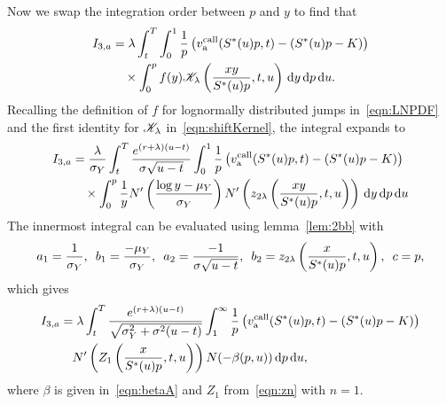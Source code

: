 	Now we swap the integration order between $p$ and $y$ to find that
		\begin{align*}
			I_{3,a} &=  \lambda  \int_t^T \int_0^1 \frac{1}{p} \left( v_{\text{a}}^{\text{call}}(S^*(u)p,t) - (S^*(u)p-K) \right)  \\
			&\quad {} \times \int_0^p f(y)\mathscr K_\lambda\left( \frac{xy}{S^*(u)p},t,u \right) \, \mathrm d y \, \mathrm d p \, \mathrm d u.
		\end{align*}
	Recalling the definition of $f$ for lognormally distributed jumps in~\eqref{eqn:LNPDF} and the first identity for $\mathscr K_\lambda$ in~\eqref{eqn:shiftKernel}, the integral expands to
		\begin{align*}
			I_{3,a} &=  \frac{\lambda}{\sigma_Y}  \int_t^T \frac{e^{(r+\lambda)(u-t)}}{\sigma\sqrt{u-t}} \int_0^1 \frac{1}{p} \left( v_{\text{a}}^{\text{call}}(S^*(u)p,t) - (S^*(u)p-K) \right)  \\
			&\quad {} \times \int_0^p \frac{1}{y}N'\left( \frac{\log y - \mu_Y}{\sigma_Y} \right)N'\left( z_{2\lambda}\left( \frac{xy}{S^*(u)p}, t, u \right)\right) \, \mathrm d y \, \mathrm d p \, \mathrm d u 
		\end{align*}
		The innermost integral can be evaluated using lemma~\ref{lem:2bb} with
		$$
			a_1 = \frac{1}{\sigma_Y}, \enskip b_1 = \frac{-\mu_Y}{\sigma_Y}, \enskip a_2 = \frac{-1}{\sigma\sqrt{u-t}}, \enskip
			b_2 = z_{2\lambda}\left( \frac{x}{S^*(u)p}, t, u \right), \enskip c = p,
		$$
		which gives
		\begin{align*}
			 I_{3,a} &=  \lambda  \int_t^T \frac{e^{(r+\lambda)(u-t)}}{\sqrt{\sigma_Y^2 + \sigma^2(u-t)}} \int_1^\infty \frac{1}{p} \left( v_{\text{a}}^{\text{call}}(S^*(u)p,t) - (S^*(u)p - K) \right)  \\
			&\quad {} N'\left( Z_1 \left( \frac{x}{S^*(u)p}, t, u \right)\right)N(-\beta(p,u)) \, \mathrm d p \, \mathrm d u,
		\end{align*}	
		where $\beta$ is given in~\eqref{eqn:betaA} and $Z_1$ from~\eqref{eqn:zn} with $n=1$.
		
